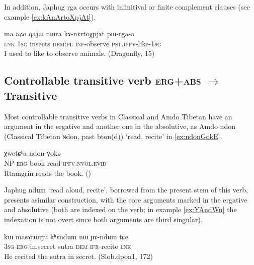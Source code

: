 \documentclass[oldfontcommands,oneside,a4paper,11pt]{article}
\newcommand{\ipa}[1]{{\phon \mbox{#1}}} %
\begin{document}
In addition, Japhug \ipa{rga}  occurs with infinitival or finite complement clauses (see example \ref{ex:kAnArtoXpjAt}).

\begin{exe}
\ex \label{ex:kAnArtoXpjAt}
\gll  
\ipa{ma} 	\ipa{aʑo} 	\ipa{qajɯ} 	\ipa{nɯra} 	\ipa{kɤ-nɤrtoχpjɤt} 	\ipa{pɯ-rga-a} \\
\textsc{lnk} \textsc{1sg} insects \textsc{dem:pl} \textsc{inf}-observe \textsc{pst.ipfv}-like-\textsc{1sg} \\
\glt I used to like to observe animals. (Dragonfly, 15)
\end{exe}

\subsection{Controllable transitive verb \textsc{erg+abs}  $\rightarrow$ Transitive}
Most controllable transitive verbs in Classical and Amdo Tibetan have an argument in the ergative and another one in the absolutive, as Amdo \ipa{ndon} (Classical Tibetan \ipa{ɴdon}, past \ipa{bton(d)}) `read, recite' in \ref{ex:ndonGokE}.


\begin{exe}
\ex \label{ex:ndonGokE}
\gll \ipa{ʂtamɖʐən-ɣə}  \ipa{χwetɕʰa}  \ipa{ndon-ɣokə} \\
NP-\textsc{erg} book read-\textsc{ipfv.nvol.evid} \\
\glt Rtamgrin reads the book. (\citealt[94:265]{haller04themchen})
\end{exe}


Japhug \ipa{ndɯn} `read aloud, recite', borrowed from the present stem of this verb, presents asimilar construction, with the core arguments marked in the ergative and absolutive (both are indexed on the verb; in example \ref{ex:YAndWn} the indexation is not overt since both arguments are third singular).

\begin{exe}
\ex \label{ex:YAndWn}
\gll \ipa{ɯʑo} 	\ipa{kɯ} 	\ipa{masɤrɯrju} 	\ipa{kʰɤndɯn} 	\ipa{nɯ} 	\ipa{ɲɤ-ndɯn} 	\ipa{tɕe} \\
\textsc{3sg} \textsc{erg} in.secret sutra \textsc{dem} \textsc{ifr}-recite \textsc{lnk} \\
\glt He recited the sutra in secret. (Slob.dpon1, 172)
\end{exe}
\end{document}
